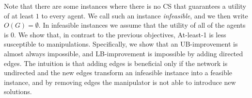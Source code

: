 \documentclass{article}
\begin{document}
Note that there are some instances where there is no CS that guarantees a utility of at least $1$ to every agent. We call such an instance \textit{infeasible}, and we then write $O(G) = \emptyset$. In infeasible instances we assume that the utility of all of the agents is $0$.
%
We show that, in contrast to the previous objectives, At-least-1 is less susceptible to manipulations. Specifically, we show that an UB-improvement is almost always impossible, and LB-improvement is impossible by adding directed edges. The intuition is that adding edges is beneficial only if the network is undirected and the new edges transform an infeasible instance into a feasible instance, and by removing edges the manipulator is not able to introduce new solutions.
%
\end{document}
